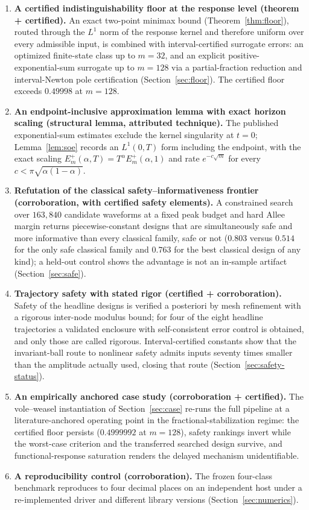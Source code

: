 \documentclass[mathematics,article,accept,pdftex,moreauthors]{Definitions/mdpi}
\begin{document}
\begin{enumerate}
\item \textbf{A certified indistinguishability floor at the response level (theorem + certified).} An exact two-point minimax bound (Theorem~\ref{thm:floor}), routed through the $L^{1}$ norm of the response kernel and therefore uniform over every admissible input, is combined with interval-certified surrogate errors: an optimized finite-state class up to $m=32$, and an explicit positive-exponential-sum surrogate up to $m=128$ via a partial-fraction reduction and interval-Newton pole certification (Section~\ref{sec:floor}). The certified floor exceeds $0.49998$ at $m=128$.
\item \textbf{An endpoint-inclusive approximation lemma with exact horizon scaling (structural lemma, attributed technique).} The published exponential-sum estimates exclude the kernel singularity at $t=0$; Lemma~\ref{lem:soe} records an $L^{1}(0,T)$ form including the endpoint, with the exact scaling $E^{+}_{m}(\alpha,T)=T^{\alpha}E^{+}_{m}(\alpha,1)$ and rate $e^{-c\sqrt{m}}$ for every $c<\pi\sqrt{\alpha(1-\alpha)}$.
\item \textbf{Refutation of the classical safety--informativeness frontier (corroboration, with certified safety elements).} A constrained search over $163{,}840$ candidate waveforms at a fixed peak budget and hard Allee margin returns piecewise-constant designs that are simultaneously safe and more informative than every classical family, safe or not ($0.803$ versus $0.514$ for the only safe classical family and $0.763$ for the best classical design of any kind); a held-out control shows the advantage is not an in-sample artifact (Section~\ref{sec:safe}).
\item \textbf{Trajectory safety with stated rigor (certified + corroboration).} Safety of the headline designs is verified a posteriori by mesh refinement with a rigorous inter-node modulus bound; for four of the eight headline trajectories a validated enclosure with self-consistent error control is obtained, and only those are called rigorous. Interval-certified constants show that the invariant-ball route to nonlinear safety admits inputs seventy times smaller than the amplitude actually used, closing that route (Section~\ref{sec:safety-status}).
\item \textbf{An empirically anchored case study (corroboration + certified).} The vole--weasel instantiation of Section~\ref{sec:case} re-runs the full pipeline at a literature-anchored operating point in the fractional-stabilization regime: the certified floor persists ($0.4999992$ at $m=128$), safety rankings invert while the worst-case criterion and the transferred searched design survive, and functional-response saturation renders the delayed mechanism unidentifiable.
\item \textbf{A reproducibility control (corroboration).} The frozen four-class benchmark reproduces to four decimal places on an independent host under a re-implemented driver and different library versions (Section~\ref{sec:numerics}).
\end{enumerate}
\end{document}
